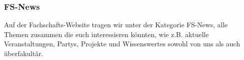 \subsubsection{FS-News}
Auf der Fachschafts-Website tragen wir unter der Kategorie FS-News, 
alle Themen zusammen die euch interessieren könnten, wie z.B. 
aktuelle Veranstaltungen, Partys, Projekte und Wissenswertes sowohl 
von uns als auch überfakultär. 